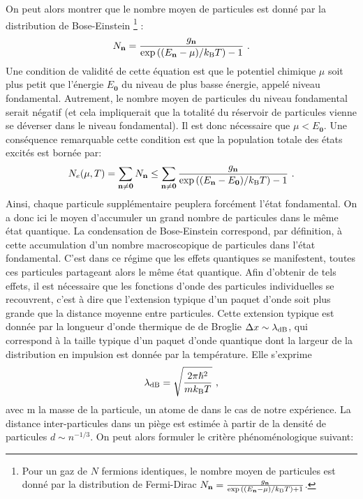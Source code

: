 On peut alors montrer que le nombre moyen de particules est donné par la distribution de Bose-Einstein \footnote{Pour un gaz de $N$ fermions identiques, le nombre moyen de particules est donné par la distribution de Fermi-Dirac $ N_{\mathbf{n}}=\frac{g_{\mathbf{n}}}{\exp{\left( (E_{\mathbf{n}}-\mu)/k_{\mathrm{B}}T\right)}+1}$.} \citep{diu1989elements}:
\begin{equation}
N_{\mathbf{n}}=\frac{g_{\mathbf{n}}}{\exp{\left( (E_{\mathbf{n}}-\mu)/k_{\mathrm{B}}T \right)}-1} \text{ .}
\end{equation}
Une condition de validité de cette équation est que le potentiel chimique $\mu$ soit plus petit que l'énergie $E_{\mathbf{0}}$ du niveau de plus basse énergie, appelé niveau fondamental. Autrement, le nombre moyen de particules du niveau fondamental serait négatif (et cela impliquerait que la totalité du réservoir de particules vienne se déverser dans le niveau fondamental). Il est donc nécessaire que $\mu < E_{\mathbf{0}}$. Une conséquence remarquable cette condition est que la population totale des états excités est bornée par:
\begin{equation}
N_e(\mu,T)=\sum_{\mathbf{n}\neq\mathbf{0}} N_{\mathbf{n}} \leq \sum_{\mathbf{n} \neq \mathbf{0}} \frac{g_{\mathbf{n}}}{\exp{\left( (E_{\mathbf{n}}-E_{\mathbf{0}})/k_{\mathrm{B}}T \right)}-1} \text{ .}
\end{equation}
Ainsi, chaque particule supplémentaire peuplera forcément l'état fondamental. On a donc ici le moyen d'accumuler un grand nombre de particules dans le même état quantique. La condensation de Bose-Einstein correspond, par définition, à cette accumulation d'un nombre macroscopique de particules dans l'état fondamental. C'est dans ce régime que les effets quantiques se manifestent, toutes ces particules partageant alors le même état quantique. Afin d'obtenir de tels effets, il est nécessaire que les fonctions d'onde des particules individuelles se recouvrent, c'est à dire que l'extension typique d'un paquet d'onde soit plus grande que la distance moyenne entre particules. Cette extension typique est donnée par la longueur d'onde thermique de de Broglie $\Delta x \sim \lambda_{\mathrm{dB}}$, qui correspond à la taille typique d'un paquet d'onde quantique dont la largeur de la distribution en impulsion est donnée par la température. Elle s'exprime \citep{diu1989elements}
\begin{equation}
\lambda_{\mathrm{dB}}=\sqrt{\frac{2\pi \hslash^2}{m k_{\mathrm{B}} T}} \text{ ,}
\end{equation}
avec m la masse de la particule, un atome de  dans le cas de notre expérience. La distance inter-particules dans un piège est estimée à partir de la densité de particules $d \sim n^{-1/3}$. On peut alors formuler le critère phénoménologique suivant:
